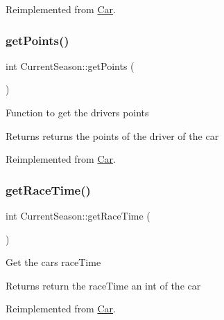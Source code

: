 Reimplemented from \hyperlink{classCar_a0192991111c42f7cba809cc9831cd5f3}{Car}.

\mbox{\label{classCurrentSeason_acea90ff7b0349785b189199d76b9a9a0}} 
\subsubsection{\texorpdfstring{get\+Points()}{getPoints()}}
{\footnotesize\ttfamily int Current\+Season\+::get\+Points (\begin{DoxyParamCaption}{ }\end{DoxyParamCaption})\hspace{0.3cm}{\ttfamily [virtual]}}

Function to get the drivers points \begin{DoxyReturn}{Returns}
returns the points of the driver of the car 
\end{DoxyReturn}


Reimplemented from \hyperlink{classCar_a0e0b71dc2b09be094ffb08e5b73c8ea2}{Car}.

\mbox{\label{classCurrentSeason_a15328f2c4192d344e970ce111a96946f}} 
\subsubsection{\texorpdfstring{get\+Race\+Time()}{getRaceTime()}}
{\footnotesize\ttfamily int Current\+Season\+::get\+Race\+Time (\begin{DoxyParamCaption}{ }\end{DoxyParamCaption})\hspace{0.3cm}{\ttfamily [virtual]}}

Get the cars race\+Time \begin{DoxyReturn}{Returns}
return the race\+Time an int of the car 
\end{DoxyReturn}


Reimplemented from \hyperlink{classCar_ac30e13eba209c1ca3bba99bf6741094a}{Car}.

\mbox{\label{classCurrentSeason_abeb85d64969c9fd4945bf64ab0464ccd}} 
